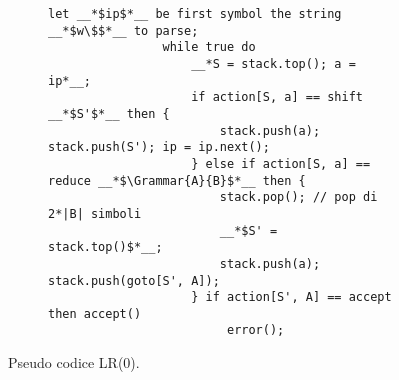 \documentclass{subfiles}
\begin{document}
\begin{figure}[h!]
    \centering
    \begin{subfigure}[b]{0.7\textwidth}
        \begin{lstlisting}[language = PSEUDO]
                let __*$ip$*__ be first symbol the string __*$w\$$*__ to parse;
                while true do 
                    __*S = stack.top(); a = ip*__;
                    if action[S, a] == shift __*$S'$*__ then {
                        stack.push(a); stack.push(S'); ip = ip.next();
                    } else if action[S, a] == reduce __*$\Grammar{A}{B}$*__ then {
                        stack.pop(); // pop di 2*|B| simboli
                        __*$S' = stack.top()$*__;
                        stack.push(a); stack.push(goto[S', A]);
                    } if action[S', A] == accept then accept()
                         error();
            \end{lstlisting}
    \end{subfigure}
    \caption{Pseudo codice LR(0).}
    \label{fig:7}
\end{figure}
\end{document}
